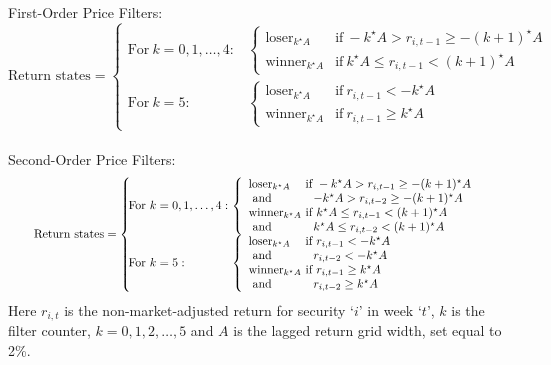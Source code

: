 \noindent First-Order Price Filters: \\ 
\begin{equation*}\label{eqn:firstorder} 
	\textrm{Return states} = \left\{ 
		\begin{array}{ll}
	\!\!\!\!\textrm{For} ~k = 0,1,\ldots,4:& \!\!\!\! \left\{ 
		\begin{array}{ll}\textrm{loser}_{k^\star A} & \!\!\!\! \textrm{if}~ -k^\star A>r_{i,t-1}\geq - (k+1)^\star A \\
		 \textrm{winner}_{k^\star A}&\!\!\!\!\textrm{if}~ k^\star A\leq r_{i,t-1} <  (k+1)^\star A
		 \end{array} \right.\\
	\!\!\!\!\textrm{For}~ k = 5:& \!\!\!\!\left\{ 
		 \begin{array}{ll}\textrm{loser}_{k^\star A} & \!\!\!\!\textrm{if}~ r_{i,t-1} <-k^\star A \\ 
		 \textrm{winner}_{k^\star A} & \!\!\!\!\textrm{if}~  r_{i,t-1} \geq  k^\star A
		 \end{array}\right.
		\end{array} 
		\right. 
	\end{equation*} \\ 
\noindent Second-Order Price Filters: \\ 
	\begin{equation}\label{eqn:secondorder} 
\scalebox{0.85}{$
	\textrm{Return states} =\left\{ 
		\begin{array}{ll}
		\!\!\!\!\textrm{For} ~k = 0,1,\ldots,4: & \!\!\!\! \left\{ 
			\begin{array}{ll}
			\textrm{loser}_{k^\star A} & \!\!\!\!\textrm{if}~ -k^\star A>r_{i,t-1}\geq - (k+1)^\star A \\ 
			\textrm{     and} & -k^\star A > r_{i,t-2} \geq -(k+1)^\star A \\
			\textrm{winner}_{k^\star A} & \!\!\!\!\textrm{if} ~k^\star A\leq r_{i,t-1} <  (k+1)^\star A \\ 
			\textrm{     and} & k^\star A \leq r_{i,t-2} < (k+1)^\star A
			\end{array}\right.\\
		\!\!\!\!\textrm{For} ~k = 5:& \!\!\!\!\left\{ 
		\begin{array}{ll}
		\textrm{loser}_{k^\star A} & \!\!\!\!\textrm{if}~ r_{i,t-1} <-k^\star A \\ 
		\textrm{     and}  & r_{i,t-2} <-k^\star A \\
		\textrm{winner}_{k^\star A} & \!\!\!\!\textrm{if}~  r_{i,t-1} \geq  k^\star A \\ 
		\textrm{     and} & r_{i,t-2} \geq k^\star A 
		\end{array}\right.
\end{array} \right. $}
	\end{equation} 
Here $r_{i,t}$ is the non-market-adjusted return for security `$i$' in week `$t$',  $k$ is the filter counter, $k=0,1,2,\ldots,5$ and $A$ is the lagged return grid width,  set equal to 2\%. 


